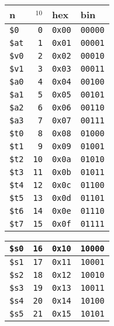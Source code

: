 \documentclass[12pt]{article}
\begin{document}
\begin{spacing}{0.8}
\begin{multicols*}{2}
\begin{flushleft}
\begin{outline}[longenum]
  \\
  \begin{tabular}{|l r l l|}\hline
  n & $_{10}$ & hex & bin   \\\hline
  \verb|$0 | & \verb| 0| & \verb|0x00| & \verb|00000| \\ \hline
  \verb|$at| & \verb| 1| & \verb|0x01| & \verb|00001| \\ \hline \hline
  \verb|$v0| & \verb| 2| & \verb|0x02| & \verb|00010| \\ \hline
  \verb|$v1| & \verb| 3| & \verb|0x03| & \verb|00011| \\ \hline \hline
  \verb|$a0| & \verb| 4| & \verb|0x04| & \verb|00100| \\ \hline
  \verb|$a1| & \verb| 5| & \verb|0x05| & \verb|00101| \\ \hline
  \verb|$a2| & \verb| 6| & \verb|0x06| & \verb|00110| \\ \hline
  \verb|$a3| & \verb| 7| & \verb|0x07| & \verb|00111| \\ \hline \hline
  \verb|$t0| & \verb| 8| & \verb|0x08| & \verb|01000| \\ \hline
  \verb|$t1| & \verb| 9| & \verb|0x09| & \verb|01001| \\ \hline
  \verb|$t2| & \verb|10| & \verb|0x0a| & \verb|01010| \\ \hline
  \verb|$t3| & \verb|11| & \verb|0x0b| & \verb|01011| \\ \hline
  \verb|$t4| & \verb|12| & \verb|0x0c| & \verb|01100| \\ \hline
  \verb|$t5| & \verb|13| & \verb|0x0d| & \verb|01101| \\ \hline
  \verb|$t6| & \verb|14| & \verb|0x0e| & \verb|01110| \\ \hline
  \verb|$t7| & \verb|15| & \verb|0x0f| & \verb|01111| \\ \hline
  \end{tabular}
  \begin{tabular}{|l r l l|}\hline
  \verb|$s0| & \verb|16| & \verb|0x10| & \verb|10000| \\ \hline
  \verb|$s1| & \verb|17| & \verb|0x11| & \verb|10001| \\ \hline
  \verb|$s2| & \verb|18| & \verb|0x12| & \verb|10010| \\ \hline
  \verb|$s3| & \verb|19| & \verb|0x13| & \verb|10011| \\ \hline
  \verb|$s4| & \verb|20| & \verb|0x14| & \verb|10100| \\ \hline
  \verb|$s5| & \verb|21| & \verb|0x15| & \verb|10101| \\ \hline

\end{tabular}
\end{outline}
\end{flushleft}
\end{multicols*}
\end{spacing}
\end{document}
